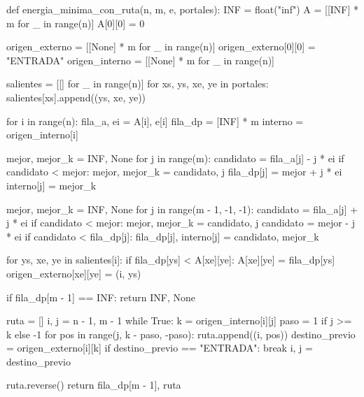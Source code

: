 \begin{pseudocode}
def energia_minima_con_ruta(n, m, e, portales):
    INF = float("inf")
    A = [[INF] * m for _ in range(n)]
    A[0][0] = 0

    origen_externo = [[None] * m for _ in range(n)]
    origen_externo[0][0] = "ENTRADA"
    origen_interno = [[None] * m for _ in range(n)]

    salientes = [[] for _ in range(n)]
    for xs, ys, xe, ye in portales:
        salientes[xs].append((ys, xe, ye))

    for i in range(n):
        fila_a, ei = A[i], e[i]
        fila_dp = [INF] * m
        interno = origen_interno[i]

        mejor, mejor_k = INF, None
        for j in range(m):
            candidato = fila_a[j] - j * ei
            if candidato < mejor:
                mejor, mejor_k = candidato, j
            fila_dp[j] = mejor + j * ei
            interno[j] = mejor_k

        mejor, mejor_k = INF, None
        for j in range(m - 1, -1, -1):
            candidato = fila_a[j] + j * ei
            if candidato < mejor:
                mejor, mejor_k = candidato, j
            candidato = mejor - j * ei
            if candidato < fila_dp[j]:
                fila_dp[j], interno[j] = candidato, mejor_k

        for ys, xe, ye in salientes[i]:
            if fila_dp[ys] < A[xe][ye]:
                A[xe][ye] = fila_dp[ys]
                origen_externo[xe][ye] = (i, ys)

    if fila_dp[m - 1] == INF:
        return INF, None

    ruta = []
    i, j = n - 1, m - 1
    while True:
        k = origen_interno[i][j]
        paso = 1 if j >= k else -1
        for pos in range(j, k - paso, -paso):
            ruta.append((i, pos))
        destino_previo = origen_externo[i][k]
        if destino_previo == "ENTRADA":
            break
        i, j = destino_previo

    ruta.reverse()
    return fila_dp[m - 1], ruta
\end{pseudocode}
